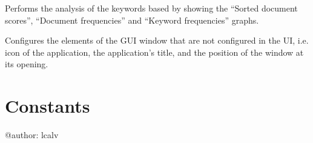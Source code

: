 \documentclass[letterpaper,10pt,english]{sphinxmanual}
\begin{document}
\begin{fulllineitems}
\begin{fulllineitems}
\end{fulllineitems}


\begin{fulllineitems}
\label{\detokenize{gui_analyze_keywords_window:src.graphical_user_interface.analyze_keywords_window.AnalyzeKeywordsWindow.do_analysis}}
\sphinxAtStartPar
Performs the analysis of the keywords based by showing the “Sorted document scores”,
“Document frequencies” and “Keyword frequencies” graphs.

\end{fulllineitems}


\begin{fulllineitems}
\label{\detokenize{gui_analyze_keywords_window:src.graphical_user_interface.analyze_keywords_window.AnalyzeKeywordsWindow.initUI}}
\sphinxAtStartPar
Configures the elements of the GUI window that are not configured in the UI,
i.e. icon of the application, the application’s title, and the position of the window at its opening.

\end{fulllineitems}


\end{fulllineitems}



\chapter{Constants}
\label{\detokenize{gui_constants:constants}}\label{\detokenize{gui_constants::doc}}\label{\detokenize{gui_constants:module-src.graphical_user_interface.constants}}
\sphinxAtStartPar
@author: lcalv
\end{document}
